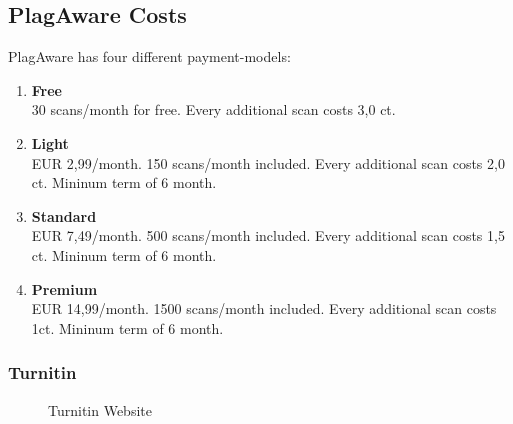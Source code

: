 \newpage
\subsection*{PlagAware Costs}
PlagAware has four different payment-models:
\begin{enumerate}
\item \textbf{Free}\\
30 scans/month for free. Every additional scan costs 3,0 ct. 
\item \textbf{Light}\\
EUR 2,99/month. 150 scans/month included. Every additional scan costs 2,0 ct. Mininum term of 6 month.
\item \textbf{Standard}\\
EUR 7,49/month. 500 scans/month included. Every additional scan costs 1,5 ct. Mininum term of 6 month.
\item \textbf{Premium}\\
EUR 14,99/month. 1500 scans/month included. Every additional scan costs 1ct. Mininum term of 6 month.
\end{enumerate}\citep{PlagawareTest}



\newpage
\subsubsection{Turnitin} 
 \begin{figure}[!h]
  \centering
  \caption{Turnitin Website}
  \label{fig:Turnitin Website}
\end{figure}

